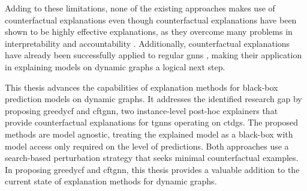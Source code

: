 Adding to these limitations, none of the existing approaches makes use of counterfactual explanations even though counterfactual explanations have been shown to be highly effective explanations, as they overcome many problems in interpretability and accountability \cite{wachter_counterfactual_2018}. Additionally, counterfactual explanations have already been successfully applied to regular \glspl{gnn} \cite{tan_learning_2022, lucic_cf-gnnexplainer_2022}, making their application in explaining models on dynamic graphs a logical next step.

This thesis advances the capabilities of explanation methods for black-box prediction models on dynamic graphs. It addresses the identified research gap by proposing \acrfull{greedycf} and \acrfull{cftgnn}, two instance-level post-hoc explainers that provide counterfactual explanations for \glspl{tgnn} operating on \glspl{ctdg}. The proposed methods are model agnostic, treating the explained model as a black-box with model access only required on the level of predictions. Both approaches use a search-based perturbation strategy that seeks minimal counterfactual examples. In proposing \gls{greedycf} and \gls{cftgnn}, this thesis provides a valuable addition to the current state of explanation methods for dynamic graphs.


